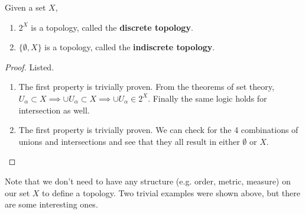 \documentclass{article}
\begin{document}
    \begin{theorem}
      Given a set $X$, 
      \begin{enumerate}
        \item $2^X$ is a topology, called the \textbf{discrete topology}. 
        \item $\{\emptyset, X \}$ is a topology, called the \textbf{indiscrete topology}. 
      \end{enumerate}
    \end{theorem}
    \begin{proof}
      Listed. 
      \begin{enumerate}
        \item The first property is trivially proven. From the theorems of set theory, $U_\alpha \subset X \implies \cup U_\alpha \subset X \implies \cup U_\alpha \in 2^X$. Finally the same logic holds for intersection as well. 
        \item The first property is trivially proven. We can check for the 4 combinations of unions and intersections and see that they all result in either $\emptyset$ or $X$. 
      \end{enumerate}
    \end{proof}

    Note that we don't need to have any structure (e.g. order, metric, measure) on our set $X$ to define a topology. Two trivial examples were shown above, but there are some interesting ones. 
\end{document}
